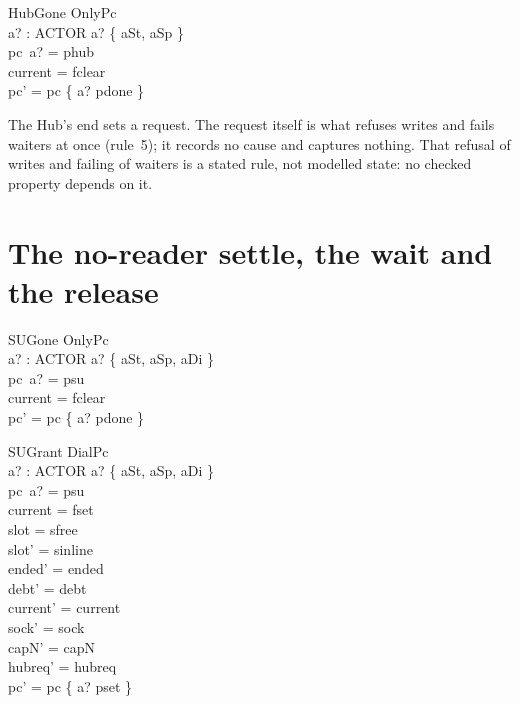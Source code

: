 \documentclass[a4paper,10pt,fleqn]{article}
\begin{document}
\begin{schema}{HubGone}
  OnlyPc \\
  a? : ACTOR
\where
  a? \in \{ aSt, aSp \} \\
  pc~a? = phub \\
  current = fclear \\
  pc' = pc \oplus \{ a? \mapsto pdone \}
\end{schema}

The Hub's end sets a request.  The request itself is what refuses writes and
fails waiters at once (rule~5); it records no cause and captures nothing.  That
refusal of writes and failing of waiters is a stated rule, not modelled state:
no checked property depends on it.

\section{The no-reader settle, the wait and the release}

\begin{schema}{SUGone}
  OnlyPc \\
  a? : ACTOR
\where
  a? \in \{ aSt, aSp, aDi \} \\
  pc~a? = psu \\
  current = fclear \\
  pc' = pc \oplus \{ a? \mapsto pdone \}
\end{schema}

\begin{schema}{SUGrant}
  DialPc \\
  a? : ACTOR
\where
  a? \in \{ aSt, aSp, aDi \} \\
  pc~a? = psu \\
  current = fset \\
  slot = sfree \\
  slot' = sinline \\
  ended' = ended \\
  debt' = debt \\
  current' = current \\
  sock' = sock \\
  capN' = capN \\
  hubreq' = hubreq \\
  pc' = pc \oplus \{ a? \mapsto pset \}
\end{schema}
\end{document}

